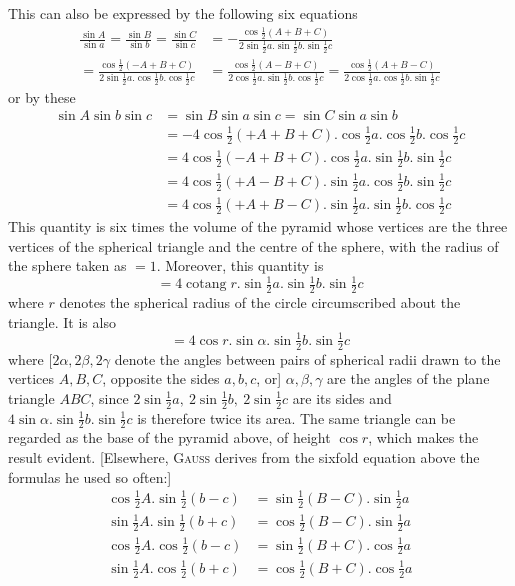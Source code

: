 %
\par
This can also be expressed by the following six equations
\begingroup\footnotesize
\[
\begin{aligned}
\frac{\sin A}{\sin a}=\frac{\sin B}{\sin b}=\frac{\sin C}{\sin c}&=-\frac{\cos\tfrac12(A+B+C)}{2\sin\tfrac12a.\sin\tfrac12b.\sin\tfrac12c}\\
=\frac{\cos\tfrac12(-A+B+C)}{2\sin\tfrac12a.\cos\tfrac12b.\cos\tfrac12c}&=\frac{\cos\tfrac12(A-B+C)}{2\cos\tfrac12a.\sin\tfrac12b.\cos\tfrac12c}=\frac{\cos\tfrac12(A+B-C)}{2\cos\tfrac12a.\cos\tfrac12b.\sin\tfrac12c}
\end{aligned}
\]
\endgroup
or by these
\[
\begin{aligned}
\sin A\sin b\sin c&=\sin B\sin a\sin c=\sin C\sin a\sin b\\
&=-4\cos\tfrac12(+A+B+C).\cos\tfrac12a.\cos\tfrac12b.\cos\tfrac12c\\
&=4\cos\tfrac12(-A+B+C).\cos\tfrac12a.\sin\tfrac12b.\sin\tfrac12c\\
&=4\cos\tfrac12(+A-B+C).\sin\tfrac12a.\cos\tfrac12b.\sin\tfrac12c\\
&=4\cos\tfrac12(+A+B-C).\sin\tfrac12a.\sin\tfrac12b.\cos\tfrac12c
\end{aligned}
\]
This quantity is six times the volume of the pyramid whose vertices are the three vertices of the spherical triangle and the centre of the sphere, with the radius of the sphere taken as \(=1\). Moreover, this quantity is
\[
=4\operatorname{cotang}r.\sin\tfrac12a.\sin\tfrac12b.\sin\tfrac12c
\]
where \(r\) denotes the spherical radius of the circle circumscribed about the triangle. It is also
\[
=4\cos r.\sin\alpha.\sin\tfrac12b.\sin\tfrac12c
\]
where [\(2\alpha,2\beta,2\gamma\) denote the angles between pairs of spherical radii drawn to the vertices \(A,B,C\), opposite the sides \(a,b,c\), or] \(\alpha,\beta,\gamma\) are the angles of the plane triangle \(ABC\), since \(2\sin\tfrac12a,\ 2\sin\tfrac12b,\ 2\sin\tfrac12c\) are its sides and \(4\sin\alpha.\sin\tfrac12b.\sin\tfrac12c\) is therefore twice its area. The same triangle can be regarded as the base of the pyramid above, of height \(\cos r\), which makes the result evident. [Elsewhere, \textsc{Gauss} derives from the sixfold equation above the formulas he used so often:]
\[
\begin{aligned}
\cos\tfrac12A.\sin\tfrac12(b-c)&=\sin\tfrac12(B-C).\sin\tfrac12a\\
\sin\tfrac12A.\sin\tfrac12(b+c)&=\cos\tfrac12(B-C).\sin\tfrac12a\\
\cos\tfrac12A.\cos\tfrac12(b-c)&=\sin\tfrac12(B+C).\cos\tfrac12a\\
\sin\tfrac12A.\cos\tfrac12(b+c)&=\cos\tfrac12(B+C).\cos\tfrac12a
\end{aligned}
\]
